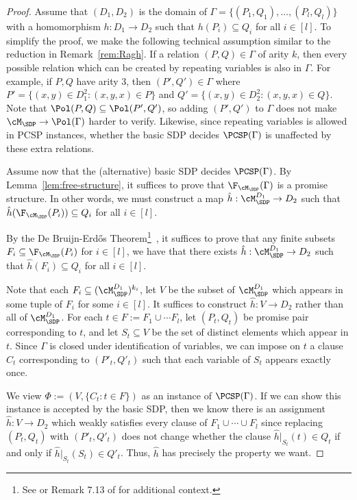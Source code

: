 \begin{proof}
{Assume that $(D_1,D_2)$ is the domain of $\Gamma = \{(P_1,Q_1), \hdots, (P_l, Q_l)\}$ with a homomorphism $h : D_1 \to D_2$ such that $h(P_i) \subseteq Q_i$ for all $i \in [l]$. To simplify the proof, we make the following technical assumption similar to the reduction in Remark~\ref{rem:Ragh}. If a relation $(P,Q) \in \Gamma$ of arity $k$, then every possible relation which can be created by repeating variables is also in $\Gamma$. For example, if $P, Q$ have arity $3$, then $(P',Q') \in \Gamma$ where $P' = \{(x,y) \in D_1^2 : (x,y,x) \in P\}$ and $Q' = \{(x,y) \in D_2^2 : (x,y,x) \in Q\}$. Note that $\Pol(P,Q) \subseteq \Pol(P',Q')$, so adding $(P',Q')$ to $\Gamma$ does not make $\cM_{\SDP} \to \Pol({\Gamma})$ harder to verify. Likewise, since repeating variables is allowed in PCSP instances, whether the basic SDP decides $\PCSP({\Gamma})$ is unaffected by these extra relations.

Assume now that the (alternative) basic SDP decides $\PCSP(\Gamma)$. By Lemma~\ref{lem:free-structure}, it suffices to prove that $\F_{\cM_{\SDP}}(\Gamma)$ is a promise structure. In other words, we must construct a map $\hat{h} : \cM_{\SDP}^{D_1} \to D_2$ such that $\hat{h}(\F_{\cM_{\SDP}}(P_i)) \subseteq Q_i$ for all $i \in [l]$. }

{
By the De Bruijn-Erd{\H o}s Theorem\footnote{{See \cite{ciardo2022clap} or Remark 7.13 of \cite{BBKO21} for additional context.}}~\cite{bruijn1951colour}, it suffices to prove that any finite subsets $F_i \subseteq \F_{\cM_{\SDP}}(P_i)$ for $i \in [l]$, we have that there exists $\hat{h} : \cM_{\SDP}^{D_1} \to D_2$ such that $\hat{h}(F_i) \subseteq Q_i$ for all $i \in [l]$.

Note that each $F_i \subseteq (\cM_{\SDP}^{D_1})^{k_i}$, let $V$ be the subset of $\cM_{\SDP}^{D_1}$ which appears in some tuple of $F_i$ for some $i \in [l].$ It suffices to construct $\hat{h} : V \to D_2$ rather than all of $\cM_{\SDP}^{D_1}$. For each $t \in F := F_1 \cup \cdots F_l$, let $(P_t, Q_t)$ be promise pair corresponding to $t$, and let $S_t \subseteq V$ be the set of distinct elements which appear in $t$. Since $\Gamma$ is closed under identification of variables, we can impose on $t$ a clause $C_t$ corresponding to $(P'_t, Q'_t)$ such that each variable of $S_t$ appears exactly once.

We view $\Phi := (V, \{C_t : t \in F\})$ as an instance of $\PCSP(\Gamma)$. If we can show this instance is accepted by the basic SDP, then we know there is an assignment $\hat{h} : V \to D_2$ which weakly satisfies every clause of $F_1 \cup \cdots \cup F_l$ since replacing $(P_t, Q_t)$ with $(P'_t, Q'_t)$ does not change whether the clause $\hat{h}|_{S_t}(t) \in Q_t$ if and only if $\hat{h}|_{S_t}(S_t) \in Q'_t$. Thus, $\hat{h}$ has precisely the property we want.

}
\end{proof}

